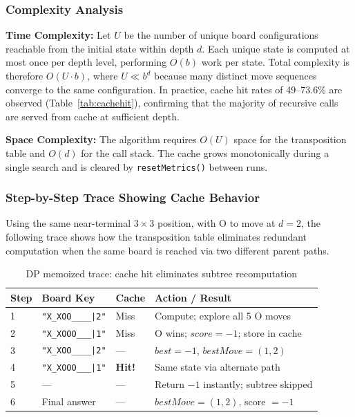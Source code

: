 \documentclass[conference]{IEEEtran}
\begin{document}
\subsubsection{Complexity Analysis}
\textbf{Time Complexity:} Let $U$ be the number of unique board
configurations reachable from the initial state within depth $d$. Each
unique state is computed at most once per depth level, performing $O(b)$
work per state. Total complexity is therefore $O(U \cdot b)$, where
$U \ll b^d$ because many distinct move sequences converge to the same
configuration. In practice, cache hit rates of 49--73.6\% are observed
(Table~\ref{tab:cachehit}), confirming that the majority of recursive
calls are served from cache at sufficient depth.

\textbf{Space Complexity:} The algorithm requires $O(U)$ space for the
transposition table and $O(d)$ for the call stack. The cache grows
monotonically during a single search and is cleared by
\texttt{resetMetrics()} between runs.

\subsubsection{Step-by-Step Trace Showing Cache Behavior}
Using the same near-terminal $3 \times 3$ position, with O to move at
$d = 2$, the following trace shows how the transposition table eliminates
redundant computation when the same board is reached via two different
parent paths.

\begin{table}[htbp]
\centering
\caption{DP memoized trace: cache hit eliminates subtree recomputation}
\label{tab:dp_trace}
\renewcommand{\arraystretch}{2.0}
\begin{tabular}{|p{0.5cm}|p{2.3cm}|p{1.0cm}|p{2.7cm}|}
\hline
\textbf{Step} & \textbf{Board Key} & \textbf{Cache} & \textbf{Action / Result} \\
\hline
1 & \texttt{"X\_XOO\_\_\_\_|2"} & Miss & Compute; explore all 5 O moves \\
\hline
2 & \texttt{"X\_XOOO\_\_\_|1"} & Miss & O wins; $score{=}{-1}$; store in cache \\
\hline
3 & \texttt{"X\_XOO\_\_\_\_|2"} & --- & $best{=}{-1}$, $bestMove{=}(1,2)$ \\
\hline
4 & \texttt{"X\_XOOO\_\_\_|1"} & \textbf{Hit!} & Same state via alternate path \\
\hline
5 & --- & --- & Return $-1$ instantly; subtree skipped \\
\hline
6 & Final answer & --- & $bestMove{=}(1,2)$, score ${= -1}$ \\
\hline
\end{tabular}
\end{table}
\end{document}

